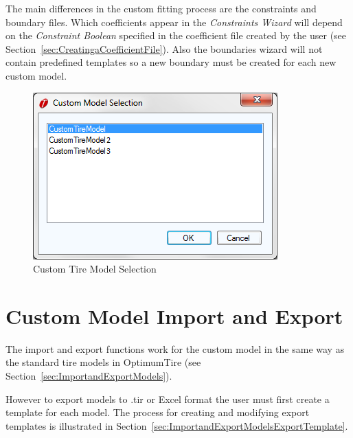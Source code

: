 The main differences in the custom fitting process are the constraints and boundary files. Which coefficients appear in the \textsl{Constraints Wizard} will depend on the \textsl{Constraint Boolean} specified in the coefficient file created by the user (see Section~\ref{sec:CreatingaCoefficientFile}). Also the boundaries wizard will not contain predefined templates so a new boundary must be created for each new custom model.

 \begin{figure}[H]
	\centering
		\includegraphics{CustomModelSelection.png}
	\caption{Custom Tire Model Selection}
	\label{fig:CustomTireModelSelection}
\end{figure}

\section{Custom Model Import and Export}
\label{sec:CustomModelImportandExport}

The import and export functions work for the custom model in the same way as the standard tire models in OptimumTire (see Section~\ref{sec:ImportandExportModels}).

However to export models to .tir or Excel format the user must first create a template for each model. The process for creating and modifying export templates is illustrated in Section~\ref{sec:ImportandExportModelsExportTemplate}.